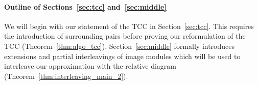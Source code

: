 \paragraph*{Outline of Sections~\ref{sec:tcc} and~\ref{sec:middle}}

We will begin with our statement of the TCC in Section~\ref{sec:tcc}.
This requires the introduction of surrounding pairs before proving our reformulation of the TCC (Theorem~\ref{thm:algo_tcc}).
Section~\ref{sec:middle} formally introduces extensions and partial interleavings of image modules which will be used to interleave our approximation with the relative diagram (Theorem~\ref{thm:interleaving_main_2}).
%
%
%

